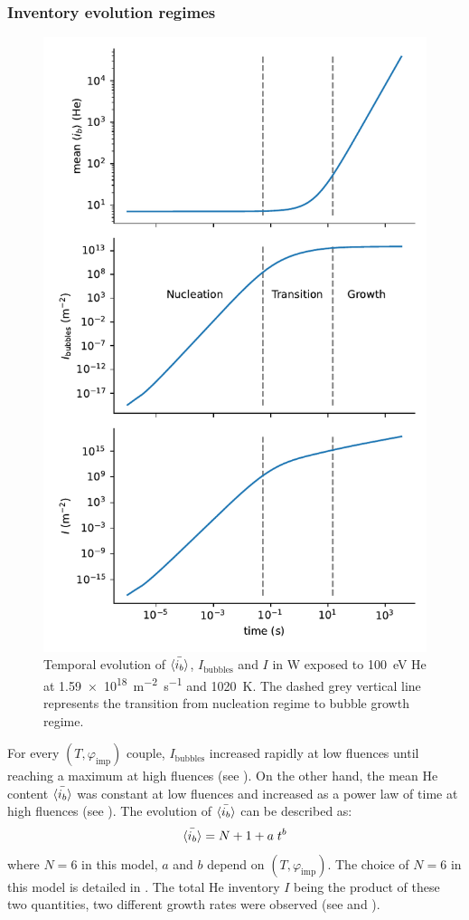 \subsubsection{Inventory evolution regimes} 

\begin{figure} [h!]
    \centering
    \includegraphics[width=0.75\linewidth]{Figures/Chapter4/parametric study/inventory_bubbles_ib.pdf}
    \caption{Temporal evolution of $\Bar{\langle i_b \rangle}$, $I_\mathrm{bubbles}$ and $I$ in W exposed to \SI{100}{eV} He at \SI{1.59e18}{m^{-2}.s^{-1}} and \SI{1020}{K}. The dashed grey vertical line represents the transition from nucleation regime to bubble growth regime.}
\end{figure}

For every $(T, \varphi_\mathrm{imp})$ couple, $I_\mathrm{bubbles}$ increased rapidly at low \glspl{fluence} until reaching a maximum at high \glspl{fluence} (see ).
On the other hand, the mean \gls{He} content $\Bar{\langle i_b \rangle}$ was constant at low \glspl{fluence} and increased as a power law of time at high \glspl{fluence} (see ).
The evolution of $\Bar{\langle i_b \rangle}$ can be described as:
\begin{equation}
    \Bar{\langle i_b \rangle} = N + 1 + a \; t^b
    \labeq{ib evolution}
\end{equation}
where $N=6$ in this model, $a$ and $b$ depend on $(T, \varphi_\mathrm{imp})$.
The choice of $N=6$ in this model is detailed in .
The total \gls{He} \gls{inventory} $I$ being the product of these two quantities, two different growth rates were observed (see  and ).

